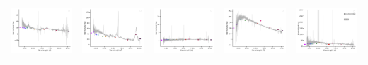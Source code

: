 \begin{center}
\begin{longtable}{l l l l l }
    \includegraphics[width=0.19\linewidth, clip]{Figs/Figs-lamost/spec-57308-EG000023N024031M01_sp01-121-STRIPE82-0002-034805.pdf} & \includegraphics[width=0.19\linewidth, clip]{Figs/Figs-lamost/spec-57308-EG000023N024031M01_sp07-202-STRIPE82-0004-031191.pdf} & \includegraphics[width=0.19\linewidth, clip]{Figs/Figs-lamost/spec-57313-EG220318S020919M01_sp03-071-SPLUS-s02s05-005410.pdf} & \includegraphics[width=0.19\linewidth, clip]{Figs/Figs-lamost/spec-57313-EG220318S020919M01_sp05-048-SPLUS-s03s05-005815.pdf} & \includegraphics[width=0.19\linewidth, clip]{Figs/Figs-lamost/spec-57313-EG220318S020919M01_sp10-173-SPLUS-s03s05-011958.pdf} \\

\end{longtable}
\end{center}
